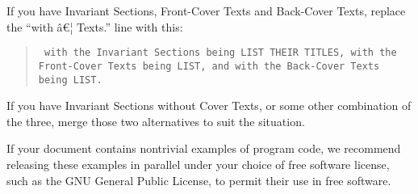 If you have Invariant Sections, Front-Cover Texts and Back-Cover Texts,
replace the ``with â€¦ Texts.'' line with this:

\begin{quote}
  \texttt{\noindent
    with the Invariant Sections being LIST THEIR TITLES, with the
    Front-Cover Texts being LIST, and with the Back-Cover Texts being LIST.
  }
\end{quote}

If you have Invariant Sections without Cover Texts, or some other
combination of the three, merge those two alternatives to suit the
situation.

If your document contains nontrivial examples of program code, we
recommend releasing these examples in parallel under your choice of free
software license, such as the GNU General Public License, to permit
their use in free software.

